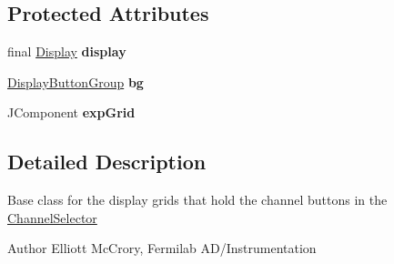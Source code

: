 \subsection*{Protected Attributes}
\begin{DoxyCompactItemize}
\item 
\hypertarget{classgov_1_1fnal_1_1ppd_1_1dd_1_1changer_1_1ChannelButtonGrid_a3c06b51489dcaacd16f6efcefe06bcaa}{final \hyperlink{interfacegov_1_1fnal_1_1ppd_1_1dd_1_1signage_1_1Display}{Display} {\bfseries display}}\label{classgov_1_1fnal_1_1ppd_1_1dd_1_1changer_1_1ChannelButtonGrid_a3c06b51489dcaacd16f6efcefe06bcaa}

\item 
\hypertarget{classgov_1_1fnal_1_1ppd_1_1dd_1_1changer_1_1ChannelButtonGrid_adf258a89161282e5215b4642ecbec812}{\hyperlink{classgov_1_1fnal_1_1ppd_1_1dd_1_1util_1_1DisplayButtonGroup}{Display\-Button\-Group} {\bfseries bg}}\label{classgov_1_1fnal_1_1ppd_1_1dd_1_1changer_1_1ChannelButtonGrid_adf258a89161282e5215b4642ecbec812}

\item 
\hypertarget{classgov_1_1fnal_1_1ppd_1_1dd_1_1changer_1_1ChannelButtonGrid_a28bdcf8d7b7664142d4360cd82f1b725}{J\-Component {\bfseries exp\-Grid}}\label{classgov_1_1fnal_1_1ppd_1_1dd_1_1changer_1_1ChannelButtonGrid_a28bdcf8d7b7664142d4360cd82f1b725}

\end{DoxyCompactItemize}


\subsection{Detailed Description}
Base class for the display grids that hold the channel buttons in the \hyperlink{classgov_1_1fnal_1_1ppd_1_1dd_1_1ChannelSelector}{Channel\-Selector}

\begin{DoxyAuthor}{Author}
Elliott Mc\-Crory, Fermilab A\-D/\-Instrumentation 
\end{DoxyAuthor}


